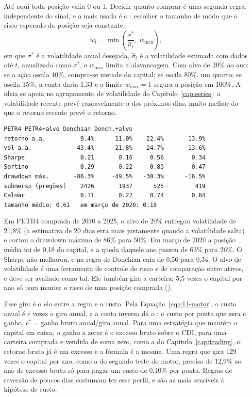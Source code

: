 Até aqui toda posição valia 0 ou 1. Decidir quanto comprar é uma segunda regra, independente do sinal, e a mais usada é o : escolher o tamanho de modo que o risco esperado da posição seja constante,
\begin{equation}
  w_t = \min\!\left(\frac{\sigma^{*}}{\hat\sigma_t},\; w_{\max}\right) ,
  \label{eq:c11-volalvo}
\end{equation}
em que $\sigma^{*}$ é a volatilidade anual desejada, $\hat\sigma_t$ é a volatilidade estimada com dados até $t$, anualizada como $\sigma^{*}$, e $w_{\max}$ limita a alavancagem. Com alvo de 20\% ao ano: se a ação oscila 40\%, compra-se metade do capital; se oscila 80\%, um quarto; se oscila 15\%, a conta daria 1,33 e o limite $w_{\max} = 1$ segura a posição em 100\%. A ideia se apoia no agrupamento de volatilidade do Capítulo~\ref{cap:series}: a volatilidade recente prevê razoavelmente a dos próximos dias, muito melhor do que o retorno recente prevê o retorno.


\begin{lstlisting}[style=saida]
                     PETR4 PETR4+alvo Donchian Donch.+alvo
retorno a.a.          9.4%      11.0%    22.4%       13.9%
vol a.a.             43.4%      21.8%    24.7%       13.6%
Sharpe                0.21       0.16     0.56        0.34
Sortino               0.29       0.22     0.83        0.47
drawdown máx.       -86.3%     -49.5%   -30.3%      -16.5%
submerso (pregões)    2426       1937      525         419
Calmar                0.11       0.22     0.74        0.84
tamanho médio: 0.61   em março de 2020: 0.18
\end{lstlisting}

Em PETR4 comprada de 2010 a 2025, o alvo de 20\% entregou volatilidade de 21,8\% (a estimativa de 20 dias erra mais justamente quando a volatilidade salta) e cortou o drawdown máximo de 86\% para 50\%. Em março de 2020 a posição média foi de 0,18 do capital, e a queda daquele ano passou de 63\% para 26\%. O Sharpe não melhorou, e na regra de Donchian caiu de 0,56 para 0,34. O alvo de volatilidade é uma ferramenta de controle de risco e de comparação entre ativos, e deve ser avaliado como tal. Ele também gira a carteira: 5,5 vezes o capital por ano só para manter o risco de uma posição comprada ().

Esse giro é o elo entre a regra e o custo. Pela Equação~\eqref{eq:c11-motor}, o custo anual é $c$ vezes o giro anual, e a conta inversa dá o : o custo por ponta que zera o ganho, $c^{*} = \text{ganho bruto anual} / \text{giro anual}$. Para uma estratégia que mantém o capital em caixa, o ganho a zerar é o excesso bruto sobre o CDI; para uma carteira comprada e vendida de soma zero, como a do Capítulo~\ref{cap:trading}, o retorno bruto já é um excesso e a fórmula é a mesma. Uma regra que gira 129 vezes o capital por ano, como a do segundo teste do motor, precisa de 12,9\% ao ano de excesso bruto só para pagar um custo de 0,10\% por ponta. Regras de reversão de poucos dias costumam ter esse perfil, e são as mais sensíveis à hipótese de custo.

